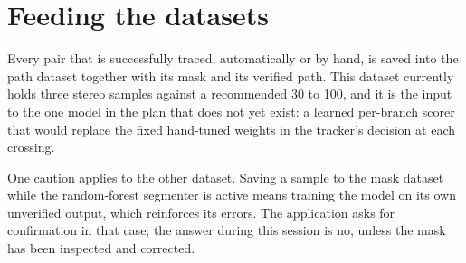 \section{Feeding the datasets}

Every pair that is successfully traced, automatically or by hand, is saved
into the path dataset together with its mask and its verified path. This
dataset currently holds three stereo samples against a recommended 30 to 100,
and it is the input to the one model in the plan that does not yet exist: a
learned per-branch scorer that would replace the fixed hand-tuned weights in
the tracker's decision at each crossing.

One caution applies to the other dataset. Saving a sample to the mask dataset
while the random-forest segmenter is active means training the model on its
own unverified output, which reinforces its errors. The application asks for
confirmation in that case; the answer during this session is no, unless the
mask has been inspected and corrected.
